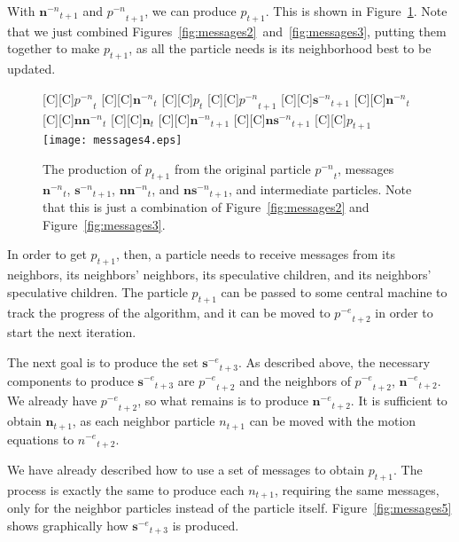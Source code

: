 \documentclass[oneside,honors]{honors}
\newcommand{\fig}[1]{Figure~\ref{fig:#1}}
\providecommand{\noeval}[1]{\ensuremath{#1^{-e}}}
\providecommand{\nonbest}[1]{\ensuremath{#1^{-n}}}
\providecommand{\p}{\ensuremath{p}}
\providecommand{\sset}{\ensuremath{\mathbf{s}}}
\providecommand{\nsset}{\ensuremath{\mathbf{ns}}}
\providecommand{\n}{\ensuremath{n}}
\providecommand{\nset}{\ensuremath{\mathbf{n}}}
\providecommand{\nnset}{\ensuremath{\mathbf{nn}}}
\begin{document}
With $\nonbest{\nset}_{t+1}$ and $\nonbest{\p}_{t+1}$, we can produce
$\p_{t+1}$.  This is shown in \fig{messages4}.  Note that we just combined
Figures~\ref{fig:messages2}~and~\ref{fig:messages3}, putting them together
to make $\p_{t+1}$, as all the particle needs is its neighborhood best to be
updated.

\begin{figure}
  \centering
  [C][C]{$\nonbest{\p}_{t}$}
  [C][C]{$\nonbest{\nset}_{t}$}
  [C][C]{$\p_{t}$}
  [C][C]{$\nonbest{\p}_{t+1}$}
  [C][C]{$\nonbest{\sset}_{t+1}$}
  [C][C]{$\nonbest{\nset}_{t}$}
  [C][C]{$\nonbest{\nnset}_{t}$}
  [C][C]{$\nset_{t}$}
  [C][C]{$\nonbest{\nset}_{t+1}$}
  [C][C]{$\nonbest{\nsset}_{t+1}$}
  [C][C]{$\p_{t+1}$}
  \texttt{[image: messages4.eps]}
  \caption{The production of $\p_{t+1}$ from the original particle 
  $\nonbest{\p}_{t}$, messages $\nonbest{\nset}_{t}$, $\nonbest{\sset}_{t+1}$,
  $\nonbest{\nnset}_{t}$, and $\nonbest{\nsset}_{t+1}$, and intermediate
  particles.  Note that this is just a combination of \fig{messages2} and
  \fig{messages3}.}
  \label{fig:messages4}
\end{figure}

In order to get $\p_{t+1}$, then, a particle needs to receive messages from its
neighbors, its neighbors' neighbors, its speculative children, and its
neighbors' speculative children.  The particle $\p_{t+1}$ can be passed to some
central machine to track the progress of the algorithm, and it can be moved to
$\noeval{\p}_{t+2}$ in order to start the next iteration.

The next goal is to produce the set $\noeval{\sset}_{t+3}$.  As described
above, the necessary components to produce $\noeval{\sset}_{t+3}$ are
$\noeval{\p}_{t+2}$ and the neighbors of $\noeval{\p}_{t+2}$,
$\noeval{\nset}_{t+2}$.  We already have $\noeval{\p}_{t+2}$, so what remains
is to produce $\noeval{\nset}_{t+2}$.  It is sufficient to obtain
$\nset_{t+1}$, as each neighbor particle $\n_{t+1}$ can be moved with the
motion equations to $\noeval{\n}_{t+2}$.

We have already described how to use a set of messages to obtain $\p_{t+1}$.
The process is exactly the same to produce each $\n_{t+1}$, requiring the same
messages, only for the neighbor particles instead of the particle itself.
\fig{messages5} shows graphically how $\noeval{\sset}_{t+3}$ is produced.
\end{document}
